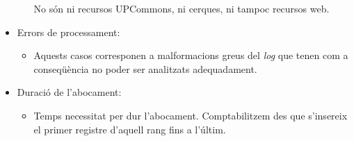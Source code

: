 \begin{itemize}
\begin{itemize}
        No són ni recursos \gls{UPCommons}, ni cerques, ni tampoc recursos web.
    \end{itemize}
    \item Errors de processament:
    \begin{itemize}
        \item Aquests casos corresponen a malformacions greus del \textit{\gls{log}} que tenen com a conseqüència no poder ser analitzats adequadament.
    \end{itemize}
    \item Duració de l’abocament:
    \begin{itemize}
        \item Temps necessitat per dur l’abocament.
        Comptabilitzem des que s’insereix el primer registre d’aquell rang fins a l’últim.
    \end{itemize}
\end{itemize}